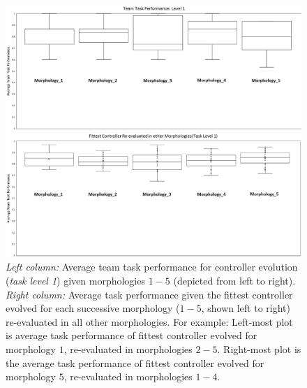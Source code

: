 \documentclass[conference]{IEEEtran}
\begin{document}
\begin{figure}[t]
	\begin{minipage}{0.5\textwidth}
		\includegraphics[width=\textwidth]{Evo_BoxPlot_Level1.eps}
	\end{minipage}
	\begin{minipage}{0.5\textwidth}
		\includegraphics[width=\textwidth]{Level1_ReEval.eps}
	\end{minipage}
\caption{\textit{Left column:} Average team task performance for controller evolution (\textit{task level 1})
given morphologies $1-5$ (depicted from left to right).
\textit{Right column:} Average task performance given the fittest controller evolved
for each successive morphology ($1-5$, shown left to right) re-evaluated in all other morphologies.
For example: Left-most plot is average task performance of fittest controller evolved for
morphology $1$, re-evaluated in morphologies $2-5$.  Right-most plot is the average task performance
of fittest controller evolved for morphology $5$, re-evaluated in morphologies $1-4$.}\label{fig:level1results}
\end{figure}
\end{document}

